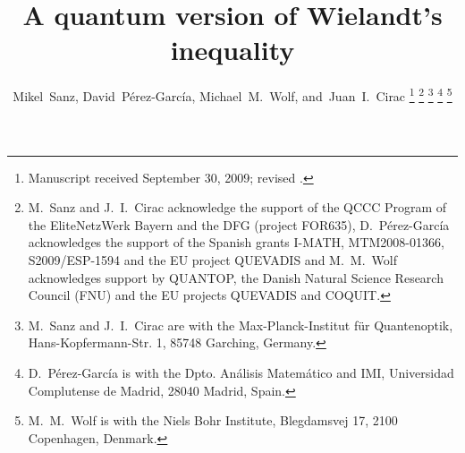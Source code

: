 \documentclass[journal,twoside]{IEEEtran}
\newcommand{\1}{\mathbbm{1}}
\renewcommand{\>}{\rangle}
\newcommand{\<}{\langle}
\begin{document}
%
\title{A quantum version of Wielandt's inequality}
%
%
%

\author{Mikel~Sanz,
        David~P\'erez-Garc\'ia,
        Michael~M.~Wolf,
        and~Juan~I.~Cirac%
\thanks{Manuscript received September 30, 2009; revised .}%
\thanks{M.~Sanz and J.~I.~Cirac acknowledge the support of the QCCC Program of the
EliteNetzWerk Bayern and the DFG (project FOR635), D.~P\'erez-Garc\'ia acknowledges the support of the Spanish grants I-MATH, MTM2008-01366, S2009/ESP-1594 and the EU project QUEVADIS and M.~M.~Wolf acknowledges support by QUANTOP, the Danish Natural Science Research Council (FNU) and the EU projects QUEVADIS and COQUIT.}%
\thanks{M.~Sanz and J.~I.~Cirac are with the Max-Planck-Institut f\"ur Quantenoptik, Hans-Kopfermann-Str. 1, 85748 Garching, Germany.}%
\thanks{D.~P\'erez-Garc\'ia is with the Dpto. An\'alisis Matem\'atico and IMI, Universidad Complutense de Madrid, 28040 Madrid, Spain.}%
\thanks{M.~M.~Wolf is with the Niels Bohr Institute, Blegdamsvej 17, 2100 Copenhagen, Denmark.}}


% 
%
\end{document}
